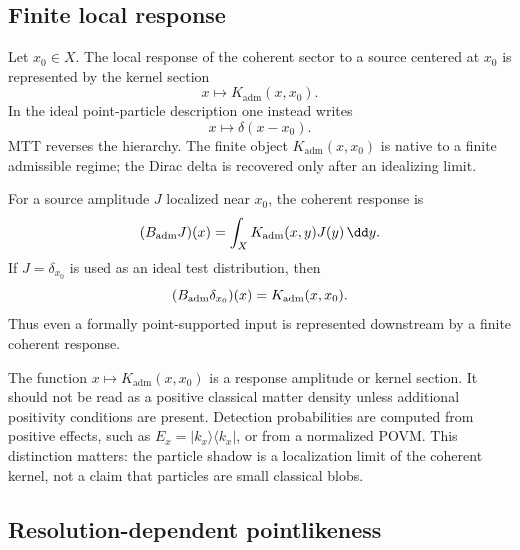 \documentclass[11pt]{article}
\newcommand{\Kadm}{K_{\mathrm{adm}}}
\begin{document}
\subsection{Finite local response}
\label{subsec:finite-local-response}

Let \(x_0\in X\). The local response of the coherent sector to a source centered at \(x_0\)
is represented by the kernel section
\begin{equation}
  x\longmapsto \Kadm(x,x_0).
  \label{eq:local-response-section}
\end{equation}
In the ideal point-particle description one instead writes
\begin{equation}
  x\longmapsto \delta(x-x_0).
\end{equation}
MTT reverses the hierarchy. The finite object \(\Kadm(x,x_0)\) is native to a finite
admissible regime; the Dirac delta is recovered only after an idealizing limit.

For a source amplitude \(J\) localized near \(x_0\), the coherent response is
\begin{equation}
  (B_{\rm adm}J)(x)
  =
  \int_X \Kadm(x,y)J(y)\,\dd y.
  \label{eq:kernel-response-source}
\end{equation}
If \(J=\delta_{x_0}\) is used as an ideal test distribution, then
\begin{equation}
  (B_{\rm adm}\delta_{x_0})(x)
  =
  \Kadm(x,x_0).
\end{equation}
Thus even a formally point-supported input is represented downstream by a finite coherent
response.

\begin{remark}
\label{rem:not-classical-density}
The function \(x\mapsto\Kadm(x,x_0)\) is a response amplitude or kernel section. It should
not be read as a positive classical matter density unless additional positivity conditions are
present. Detection probabilities are computed from positive effects, such as
\(E_x=|k_x\rangle\langle k_x|\), or from a normalized POVM. This distinction matters:
the particle shadow is a localization limit of the coherent kernel, not a claim that particles
are small classical blobs.
\end{remark}

\subsection{Resolution-dependent pointlikeness}
\label{subsec:resolution-dependent-pointlikeness}
\end{document}
